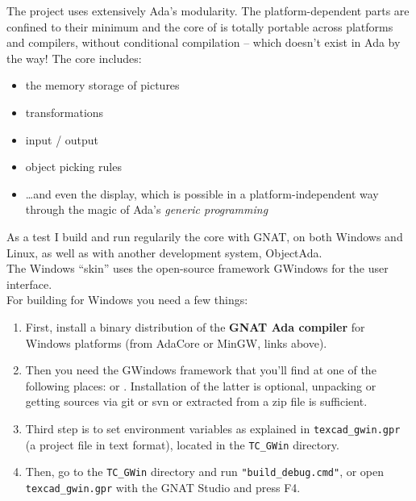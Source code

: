 \documentclass[11pt,a4paper]{article}
\begin{document}
The project uses extensively Ada's modularity.
The platform-dependent parts are confined to their minimum and
the core of {\TC} is totally portable across platforms and
compilers, without conditional compilation -- which doesn't exist in Ada
by the way! The core includes:
%
\begin{itemize}
  \item the memory storage of pictures
  \item transformations
  \item input / output
  \item object picking rules
  \item \ldots and even the display, which is possible in a platform-independent
        way through the magic of Ada's {\em generic programming}
\end{itemize}
%
As a test I build and run regularily the core with GNAT, on both Windows
and Linux, as well as with another development system, ObjectAda.\\

The Windows ``skin'' uses the open-source framework GWindows for the user interface.\\

For building {\TC} for Windows you need a few things:

\begin{enumerate}
  \item First, install 
a binary distribution of the {\bf GNAT Ada compiler} for Windows platforms
(from AdaCore or MinGW, links above).
  \item Then you need the GWindows framework that you'll find at one of the following places:
   or
  .
Installation of the latter is optional, unpacking or getting sources via git or svn or
extracted from a zip file is sufficient.
  \item Third step is to set environment variables as explained in {\tt texcad\_gwin.gpr}
(a project file in text format), located
in the {\tt TC\_GWin} directory.
  \item Then, go to the {\tt TC\_GWin} directory and run {\tt "build\_debug.cmd"},
or open {\tt texcad\_gwin.gpr} with the GNAT Studio and press F4.
\end{enumerate}
\end{document}
